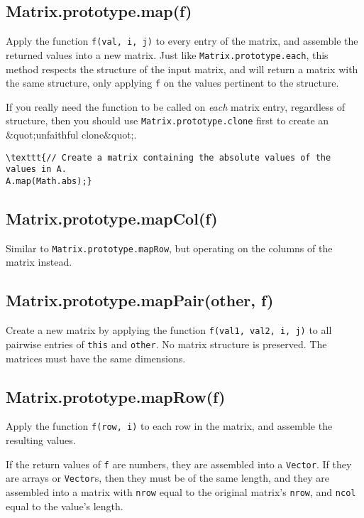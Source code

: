 \documentclass{article}
\begin{document}
    \subsection*{Matrix.prototype.map(f)}
    Apply the function \texttt{f(val, i, j)} to every entry of the matrix, and assemble the
returned values into a new matrix. Just like \texttt{Matrix.prototype.each}, this method
respects the structure of the input matrix, and will return a matrix with the
same structure, only applying \texttt{f} on the values pertinent to the structure.


If you really need the function to be called on \emph{each} matrix entry, regardless of
structure, then you should use \texttt{Matrix.prototype.clone} first to create an
\&quot;unfaithful clone\&quot;.


\begin{lstlisting}
\texttt{// Create a matrix containing the absolute values of the values in A.
A.map(Math.abs);}\end{lstlisting}

    \subsection*{Matrix.prototype.mapCol(f)}
    Similar to \texttt{Matrix.prototype.mapRow}, but operating on the columns of the matrix
instead.


    \subsection*{Matrix.prototype.mapPair(other, f)}
    Create a new matrix by applying the function \texttt{f(val1, val2, i, j)} to all pairwise entries
of \texttt{this} and \texttt{other}. No matrix structure is preserved.
The matrices must have the same dimensions.


    \subsection*{Matrix.prototype.mapRow(f)}
    Apply the function \texttt{f(row, i)} to each row in the matrix, and assemble the resulting
values.


If the return values of \texttt{f} are numbers, they are assembled into a \texttt{Vector}. If they
are arrays or \texttt{Vector}s, then they must be of the same length, and they are assembled
into a matrix with \texttt{nrow} equal to the original matrix's \texttt{nrow}, and \texttt{ncol} equal to
the value's length.
\end{document}
